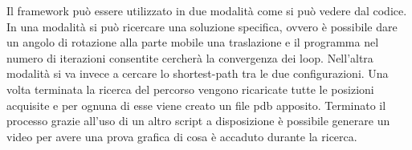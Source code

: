 Il framework può essere utilizzato in due modalità come si può vedere dal codice. In una modalità si può ricercare una soluzione specifica, ovvero è possibile dare un angolo di rotazione alla parte mobile una traslazione e il programma nel numero di iterazioni consentite cercherà la convergenza dei loop. Nell'altra modalità si va invece a cercare lo shortest-path tra le due configurazioni. Una volta terminata la ricerca del percorso vengono ricaricate tutte le posizioni acquisite e per ognuna di esse viene creato un file pdb apposito. Terminato il processo grazie all'uso di un altro script a disposizione è possibile generare un video per avere una prova grafica di cosa è accaduto durante la ricerca. 